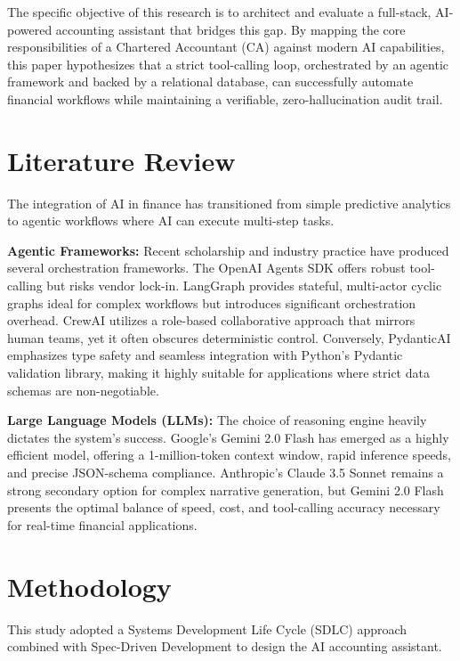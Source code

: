 \documentclass[12pt,a4paper]{article}
\begin{document}
The specific objective of this research is to architect and evaluate a full-stack, AI-powered accounting assistant that bridges this gap. By mapping the core responsibilities of a Chartered Accountant (CA) \cite{icap2023} against modern AI capabilities, this paper hypothesizes that a strict tool-calling loop, orchestrated by an agentic framework and backed by a relational database, can successfully automate financial workflows while maintaining a verifiable, zero-hallucination audit trail.

\section{Literature Review}
The integration of AI in finance has transitioned from simple predictive analytics to agentic workflows where AI can execute multi-step tasks. 

\textbf{Agentic Frameworks:} Recent scholarship and industry practice have produced several orchestration frameworks. The OpenAI Agents SDK \cite{openai2025} offers robust tool-calling but risks vendor lock-in. LangGraph \cite{langchain2025} provides stateful, multi-actor cyclic graphs ideal for complex workflows but introduces significant orchestration overhead. CrewAI \cite{crewai2025} utilizes a role-based collaborative approach that mirrors human teams, yet it often obscures deterministic control. Conversely, PydanticAI \cite{pydantic2025} emphasizes type safety and seamless integration with Python's Pydantic validation library, making it highly suitable for applications where strict data schemas are non-negotiable.

\textbf{Large Language Models (LLMs):} The choice of reasoning engine heavily dictates the system's success. Google's Gemini 2.0 Flash \cite{gemini2025} has emerged as a highly efficient model, offering a 1-million-token context window, rapid inference speeds, and precise JSON-schema compliance. Anthropic’s Claude 3.5 Sonnet \cite{anthropic2025} remains a strong secondary option for complex narrative generation, but Gemini 2.0 Flash presents the optimal balance of speed, cost, and tool-calling accuracy necessary for real-time financial applications.

\section{Methodology}
This study adopted a Systems Development Life Cycle (SDLC) approach combined with Spec-Driven Development to design the AI accounting assistant.
\end{document}
